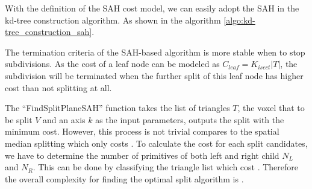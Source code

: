 With the definition of the SAH cost model, we can easily adopt the SAH in the kd-tree construction algorithm. As shown in the algorithm \ref{algo:kd-tree_construction_sah}. 

The termination criteria of the SAH-based algorithm is more stable when to stop subdivisions. As the cost of a leaf node can be modeled as \(C_{leaf} = K_{isect}\lvert T \rvert\), the subdivision will be terminated when the further split of this leaf node has higher cost than not splitting at all. 

The ``FindSplitPlaneSAH'' function takes the list of triangles \(T\), the voxel that to be split \(V\) and an axis \(k\) as the input parameters, outputs the split with the minimum cost. However, this process is not trivial compares to the spatial median splitting which only costs \mycomplexityconst. To calculate the cost for each split candidates, we have to determine the number of primitives of both left and right child \(N_{L}\) and \(N_{R}\). This can be done by classifying the triangle list which cost \mycomplexityn. Therefore the overall complexity for finding the optimal split algorithm is \mycomplexitysqrtn. 


